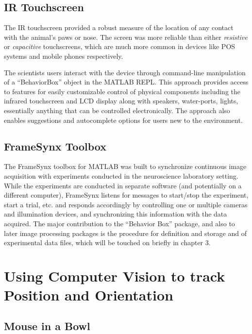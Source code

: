 \subsection{IR Touchscreen}\label{sec:ir-touchscreen}

The IR touchscreen provided a robust measure of the location of any contact with the animal's paws or nose.
The screen was more reliable than either \emph{resistive} or \emph{capacitive} touchscreens, which are much more common in devices like POS systems and mobile phones respectively.

The scientists users interact with the device through command-line manipulation of a ``BehaviorBox'' object in the MATLAB REPL.
This approach provides access to features for easily customizable control of physical components including the infrared touchscreen and LCD display along with speakers, water-ports, lights, essentially anything that can be controlled electronically.
The approach also enables suggestions and autocomplete options for users new to the environment.

\subsection{FrameSynx Toolbox}\label{sec:framesynx-toolbox}

The FrameSynx toolbox for MATLAB was built to synchronize continuous image acquisition with experiments conducted in the neuroscience laboratory setting.
While the experiments are conducted in separate software (and potentially on a different computer), FrameSynx listens for messages to start/stop the experiment, start a trial, etc. and responds accordingly by controlling one or multiple cameras and illumination devices, and synchronizing this information with the data acquired.
The major contribution to the ``Behavior Box'' package, and also to later image processing packages is the procedure for definition and storage and of experimental data files, which will be touched on briefly in chapter 3.

\section{Using Computer Vision to track Position and Orientation}\label{sec:using-computer-vision-to-track-position-and-orientation}

\subsection{Mouse in a Bowl}\label{sec:mouse-in-a-bowl}

